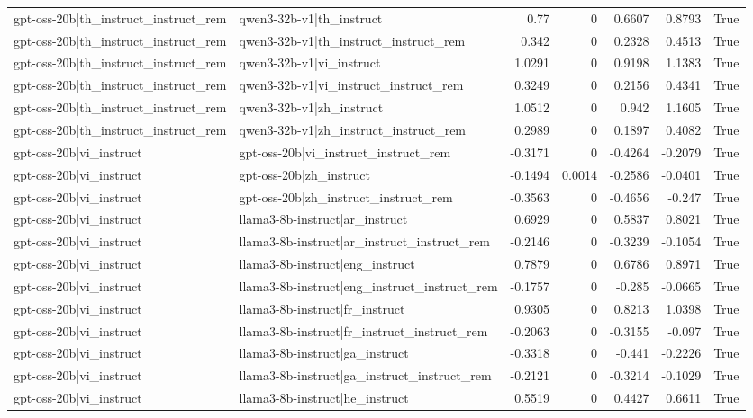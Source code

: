 \begin{table}
\begin{tabular}{l l r r r r l}
gpt-oss-20b|th_instruct_instruct_rem & qwen3-32b-v1|th_instruct & 0.77 & 0 & 0.6607 & 0.8793 & True \\
gpt-oss-20b|th_instruct_instruct_rem & qwen3-32b-v1|th_instruct_instruct_rem & 0.342 & 0 & 0.2328 & 0.4513 & True \\
gpt-oss-20b|th_instruct_instruct_rem & qwen3-32b-v1|vi_instruct & 1.0291 & 0 & 0.9198 & 1.1383 & True \\
gpt-oss-20b|th_instruct_instruct_rem & qwen3-32b-v1|vi_instruct_instruct_rem & 0.3249 & 0 & 0.2156 & 0.4341 & True \\
gpt-oss-20b|th_instruct_instruct_rem & qwen3-32b-v1|zh_instruct & 1.0512 & 0 & 0.942 & 1.1605 & True \\
gpt-oss-20b|th_instruct_instruct_rem & qwen3-32b-v1|zh_instruct_instruct_rem & 0.2989 & 0 & 0.1897 & 0.4082 & True \\
gpt-oss-20b|vi_instruct & gpt-oss-20b|vi_instruct_instruct_rem & -0.3171 & 0 & -0.4264 & -0.2079 & True \\
gpt-oss-20b|vi_instruct & gpt-oss-20b|zh_instruct & -0.1494 & 0.0014 & -0.2586 & -0.0401 & True \\
gpt-oss-20b|vi_instruct & gpt-oss-20b|zh_instruct_instruct_rem & -0.3563 & 0 & -0.4656 & -0.247 & True \\
gpt-oss-20b|vi_instruct & llama3-8b-instruct|ar_instruct & 0.6929 & 0 & 0.5837 & 0.8021 & True \\
gpt-oss-20b|vi_instruct & llama3-8b-instruct|ar_instruct_instruct_rem & -0.2146 & 0 & -0.3239 & -0.1054 & True \\
gpt-oss-20b|vi_instruct & llama3-8b-instruct|eng_instruct & 0.7879 & 0 & 0.6786 & 0.8971 & True \\
gpt-oss-20b|vi_instruct & llama3-8b-instruct|eng_instruct_instruct_rem & -0.1757 & 0 & -0.285 & -0.0665 & True \\
gpt-oss-20b|vi_instruct & llama3-8b-instruct|fr_instruct & 0.9305 & 0 & 0.8213 & 1.0398 & True \\
gpt-oss-20b|vi_instruct & llama3-8b-instruct|fr_instruct_instruct_rem & -0.2063 & 0 & -0.3155 & -0.097 & True \\
gpt-oss-20b|vi_instruct & llama3-8b-instruct|ga_instruct & -0.3318 & 0 & -0.441 & -0.2226 & True \\
gpt-oss-20b|vi_instruct & llama3-8b-instruct|ga_instruct_instruct_rem & -0.2121 & 0 & -0.3214 & -0.1029 & True \\
gpt-oss-20b|vi_instruct & llama3-8b-instruct|he_instruct & 0.5519 & 0 & 0.4427 & 0.6611 & True \\

\end{tabular}
\end{table}
